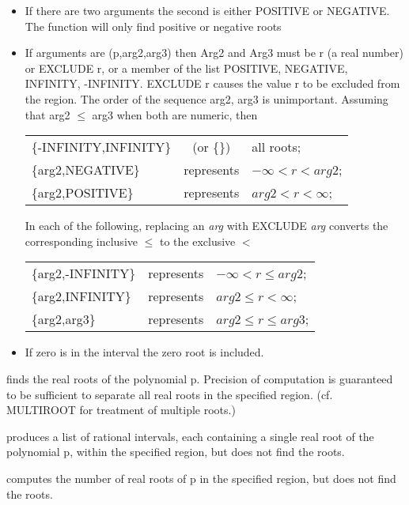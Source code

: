 \begin{itemize}
\item If there are two arguments the second is either POSITIVE or NEGATIVE.
The function will only find positive or negative roots

\item If arguments are (p,arg2,arg3) then
Arg2 and Arg3 must be r (a real number) or  EXCLUDE r,  or a member of
the list POSITIVE, NEGATIVE, INFINITY, -INFINITY.  EXCLUDE r causes the
value r to be excluded from the region.  The order of the sequence
arg2, arg3 is unimportant.  Assuming that arg2 $\leq$ arg3 when both are
numeric, then

\begin{tabular}{l c l}
\{-INFINITY,INFINITY\} & (or \{\}) & all roots; \\
\{arg2,NEGATIVE\} & represents & $-\infty < r < arg2$; \\
\{arg2,POSITIVE\} & represents & $arg2 < r < \infty$;
\end{tabular}

In each of the following, replacing an {\em arg} with EXCLUDE {\em arg}
converts the corresponding inclusive $\leq$ to the exclusive $<$

\begin{tabular}{l c l}
\{arg2,-INFINITY\} & represents & $-\infty < r \leq arg2$; \\
\{arg2,INFINITY\} & represents & $arg2 \leq r < \infty$; \\
\{arg2,arg3\} & represents & $arg2 \leq r \leq arg3$;
\end{tabular}

\item If zero is in the interval the zero root is included.
\end{itemize}

\begin{description}
\item[REALROOTS] finds the real roots of the polynomial
p.  Precision of computation is guaranteed to be sufficient to
separate all real roots in the specified region.  (cf. MULTIROOT for
treatment of multiple roots.)

\item[ISOLATER] produces a list of rational intervals, each
containing a single real root of the polynomial p, within the specified
region, but does not find the roots.

\item[RLROOTNO] computes the number of real roots of p in
the specified region, but does not find the roots.
\end{description}

